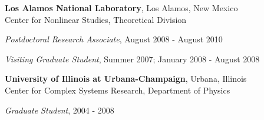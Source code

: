 {\bf Los Alamos National Laboratory}, Los Alamos, New Mexico\\
Center for Nonlinear Studies, Theoretical Division
\begin{list1}
\item[] {\em Postdoctoral Research Associate}, August 2008 - August 2010
\item[] {\em Visiting Graduate Student}, Summer 2007; January 2008 - August 2008
\end{list1}

{\bf University of Illinois at Urbana-Champaign}, Urbana, Illinois\\
Center for Complex Systems Research, Department of Physics
\begin{list1}
\item[] {\em Graduate Student}, 2004 - 2008
\end{list1}


